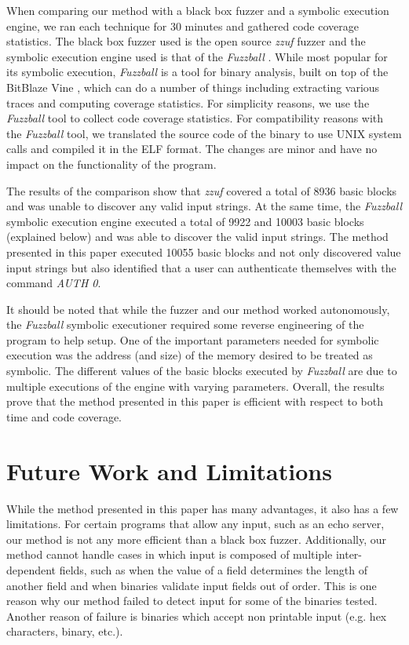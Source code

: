 \documentclass{acm_proc_article-sp}
\begin{document}
When comparing our method with a black box fuzzer and a symbolic execution engine, we ran each technique for 30 minutes and gathered code coverage statistics.
The black box fuzzer used is the open source \textit{zzuf} fuzzer and the symbolic execution engine used is that of the \textit{Fuzzball} \cite{zzuf, fuzzball}.
While most popular for its symbolic execution, \textit{Fuzzball} is a tool for binary analysis, built on top of the BitBlaze Vine \cite{bitblaze, bitblazesite}, which can do a number of things including extracting various traces and computing coverage statistics.
For simplicity reasons, we use the \textit{Fuzzball} tool to collect code coverage statistics.
For compatibility reasons with the \textit{Fuzzball} tool, we translated the source code of the binary to use UNIX system calls and compiled it in the ELF format.
The changes are minor and have no impact on the functionality of the program.

The results of the comparison show that \textit{zzuf} covered a total of 8936 basic blocks and was unable to discover any valid input strings.
At the same time, the \textit{Fuzzball} symbolic execution engine executed a total of 9922 and 10003 basic blocks (explained below) and was able to discover the valid input strings.
The method presented in this paper executed 10055 basic blocks and not only discovered value input strings but also identified that a user can authenticate themselves with the command \textit{AUTH 0}.

It should be noted that while the fuzzer and our method worked autonomously, the \textit{Fuzzball} symbolic executioner required some reverse engineering of the program to help setup.
One of the important parameters needed for symbolic execution was the address (and size) of the memory desired to be treated as symbolic.
The different values of the basic blocks executed by \textit{Fuzzball} are due to multiple executions of the engine with varying parameters.
Overall, the results prove that the method presented in this paper is efficient with respect to both time and code coverage.

\section{Future Work and Limitations} \label{futurework}
While the method presented in this paper has many advantages, it also has a few limitations.
For certain programs that allow any input, such as an echo server, our method is not any more efficient than a black box fuzzer.
Additionally, our method cannot handle cases in which input is composed of multiple inter-dependent fields, such as when the value of a field determines the length of another field and when binaries validate input fields out of order.
This is one reason why our method failed to detect input for some of the binaries tested.
Another reason of failure is binaries which accept non printable input (e.g. hex characters, binary, etc.).
\end{document}
